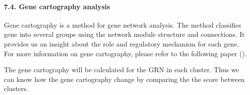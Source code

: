 \documentclass[letterpaper,10pt,english]{sphinxmanual}
\begin{document}
\paragraph{7.4. Gene cartography analysis}
\label{\detokenize{notebooks/04_Network_analysis/Network_analysis_with_Paul_etal_2015_data:7.4.-Gene-cartography-analysis}}
Gene cartography is a method for gene network analysis. The method classifies gene into several groups using the network module structure and connections. It provides us an insight about the role and regulatory mechanism for each gene. For more information on gene cartography, please refer to the following paper ().

The gene cartography will be calculated for the GRN in each cluster. Thus we can know how the gene cartography change by comparing the the score between clusters.

{
\begin{sphinxVerbatim}[commandchars=\\\{\}]
\llap{\color{nbsphinxin}[58]:\,\hspace{\fboxrule}\hspace{\fboxsep}}
                                           \PYG{p}{[}  \PYG{p}{]}
                                            
                                            
\end{sphinxVerbatim}
}
\end{document}
